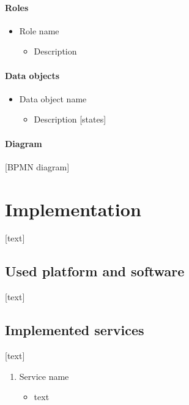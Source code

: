\documentclass[11pt,a4paper]{article}
\begin{document}
\paragraph{Roles}

\begin{itemize}
    \item Role name
    \begin{itemize}
        \item Description
    \end{itemize}
\end{itemize}

\paragraph{Data objects}

\begin{itemize}
    \item Data object name
    \begin{itemize}
        \item Description [states]
    \end{itemize}
\end{itemize}

\paragraph{Diagram}

[BPMN diagram]

\section{Implementation}

[text]

\subsection{Used platform and software}

[text]

\subsection{Implemented services}

[text]

\begin{enumerate}
    \item Service name
    \begin{itemize}
        \item text
    \end{itemize}
\end{enumerate}
\end{document}
